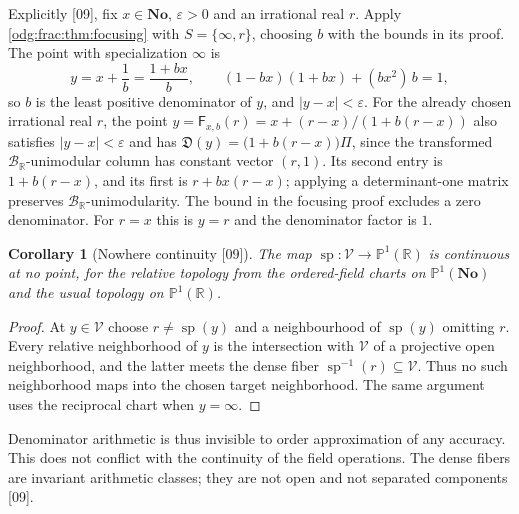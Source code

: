 \documentclass[11pt,oneside]{article}
\numberwithin{equation}{section}
\newtheorem{corollary}[corollary]{Corollary}
\theoremstyle{definition}
\theoremstyle{remark}
\newcommand{\No}{\mathbf{No}}
\newcommand{\R}{\mathbb R}
\newcommand{\BR}{\mathcal B_{\R}}
\newcommand{\src}[1]{\textup{\textsf{\small[#1]}}}
\newcommand{\Den}{\mathfrak D}
\newcommand{\spz}{\operatorname{sp}}
\newcommand{\Vreg}{\mathcal V}
\begin{document}
Explicitly \src{09}, fix $x\in\No$, $\varepsilon>0$ and an irrational real
$r$. Apply \cref{odg:frac:thm:focusing} with $S=\{\infty,r\}$, choosing
$b$ with the bounds in its proof. The point with specialization $\infty$ is
\[
 y=x+\frac1b=\frac{1+bx}{b},\qquad (1-bx)(1+bx)+(bx^2)\,b=1,
\]
so $b$ is the least positive denominator of $y$, and $|y-x|<\varepsilon$. For the
already chosen irrational real $r$, the point
$y=\mathsf F_{x,b}(r)=x+(r-x)/(1+b(r-x))$ also satisfies $|y-x|<\varepsilon$
and has
$\Den(y)=\bigl(1+b(r-x)\bigr)\Pi$, since the transformed $\BR$-unimodular column
has constant vector $(r,1)$. Its second entry is $1+b(r-x)$, and its
first is $r+bx(r-x)$; applying a determinant-one matrix preserves
$\BR$-unimodularity. The bound in the focusing proof excludes a zero
denominator. For $r=x$ this is $y=r$ and the denominator factor is $1$.

\begin{corollary}[Nowhere continuity \src{09}]\label{odg:frac:cor:discontinuous}
The map $\spz:\Vreg\to\mathbb P^1(\R)$ is continuous at no point, for the
relative topology from the ordered-field charts on $\mathbb P^1(\No)$ and
the usual topology on $\mathbb P^1(\R)$.
\end{corollary}
\begin{proof}
At $y\in\Vreg$ choose $r\ne\spz(y)$ and a neighbourhood of $\spz(y)$ omitting
$r$. Every relative neighborhood of $y$ is the intersection with $\Vreg$
of a projective open neighborhood, and the latter meets the dense fiber
$\spz^{-1}(r)\subseteq\Vreg$. Thus no such neighborhood maps into the
chosen target neighborhood. The same argument uses the reciprocal chart
when $y=\infty$.
\end{proof}

Denominator arithmetic is thus invisible to order approximation of any
accuracy. This does not conflict with the continuity of the field operations.
The dense fibers are invariant arithmetic classes; they are not open and not
separated components \src{09}.
\end{document}
